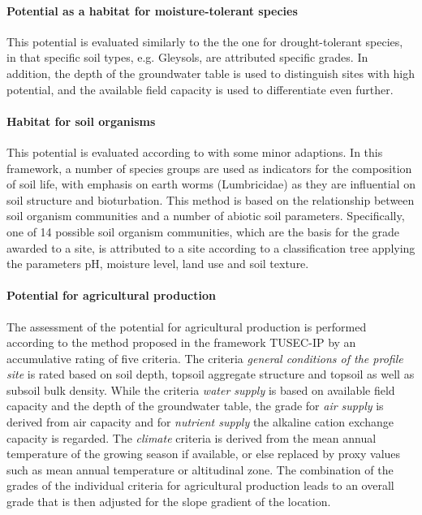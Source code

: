 \documentclass[soilsystems,article,submit,moreauthors,pdftex,10pt,a4paper]{Definitions/mdpi}
\begin{document}
\paragraph{Potential as a habitat for moisture-tolerant species}
This potential is evaluated similarly to the the one for drought-tolerant species, in that specific soil types, e.g. Gleysols, are attributed specific grades. In addition, the depth of the groundwater table is used to distinguish sites with high potential, and the available field capacity is used to differentiate even further.
\paragraph{Habitat for soil organisms}
This potential is evaluated according to \cite{Beylich2005} with some minor adaptions. In this framework, a number of species groups are used as indicators for the composition of soil life, with emphasis on earth worms (Lumbricidae) as they are influential on soil structure and bioturbation. This method is based on the relationship between soil organism communities and a number of abiotic soil parameters. Specifically, one of 14 possible soil organism communities, which are the basis for the grade awarded to a site, is attributed to a site according to a classification tree applying the parameters pH, moisture level, land use and soil texture.
\paragraph{Potential for agricultural production}
The assessment of the potential for agricultural production is performed according to the method proposed in the framework TUSEC-IP \citep{Lehmann2008} by an accumulative rating of five criteria. The criteria \emph{general conditions of the profile site} is rated based on soil depth, topsoil aggregate structure and topsoil as well as subsoil bulk density. While the criteria \emph{water supply} is based on available field capacity and the depth of the groundwater table, the grade for \emph{air supply} is derived from air capacity and for \emph{nutrient supply} the alkaline cation exchange capacity is regarded. The \emph{climate} criteria is derived from the mean annual temperature of the growing season if available, or else replaced by proxy values such as mean annual temperature or altitudinal zone. The combination of the grades of the individual criteria for agricultural production leads to an overall grade that is then adjusted for the slope gradient of the location.
\end{document}
